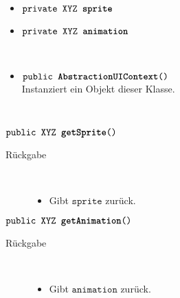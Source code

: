 \begin{description}
\item[Beschreibung] \hfill \\ 
\item[Attribute] \hfill \\
	\vspace{-.8cm}
	\begin{itemize}	
		\item $\texttt{private XYZ \textbf{sprite}}$ \\ 		
		\item $\texttt{private XYZ \textbf{animation}}$ \\ 
		\end{itemize}
	
\item[Konstruktoren] \hfill \\
	\vspace{-.8cm}
	\begin{itemize}
		\item $\texttt{public \textbf{AbstractionUIContext}()}$ \\ Instanziert ein Objekt dieser Klasse.

	\end{itemize}
	
\item[Methoden] \hfill \\
	\vspace{-.8cm}
		\item $\texttt{public XYZ \textbf{getSprite}()}$ \\ 
		\begin{description}
			\item[Rückgabe] \hfill \\
			\vspace{-.8cm}
			\begin{itemize}
				\item Gibt $\texttt{sprite}$ zurück.
			\end{itemize}
			\end{description}
			
		\item $\texttt{public XYZ \textbf{getAnimation}()}$ \\ 
		\begin{description}
			\item[Rückgabe] \hfill \\
			\vspace{-.8cm}
			\begin{itemize}
				\item Gibt $\texttt{animation}$ zurück.
			\end{itemize}
			\end{description}
			
			
			
	\end{description}	

